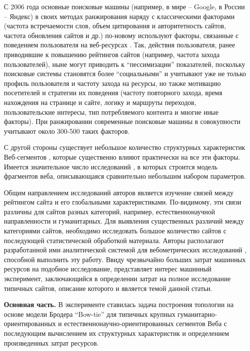С 2006 года основные поисковые машины (например, в мире -- Google, в России -- Яндекс) в своих методах ранжирования наряду с классическими факторами \cite{Kleinberg, BrinPage, Chakrabarti} (частота встречаемости слов, объем цитирования и авторитетность сайтов, частота обновления сайтов и др.) по-новому используют факторы, связанные с поведением пользователя на веб-ресурсах \cite{GuhaKunduBhadra,AntoniouPlegasTsakalidis,FeuerSavevAslam}. Так, действия пользователя, ранее приводившие к повышению рейтингов сайтов (например, частота захода пользователей), ныне могут приводить к “пессимизации” показателей, поскольку поисковые системы становятся более “социальными” и учитывают уже не только профиль пользователя и частоту захода на ресурсы, но также мотивацию посетителей и стратегии их поведения (частоту повторного захода, время нахождения на странице и сайте, логику и маршруты переходов, пользовательские интересы, тип потребляемого контента и многие иные факторы). При ранжировании современные поисковые машины в совокупности учитывают около 300-500 таких факторов.

С другой стороны существует небольшое количество структурных характеристик Веб-сегментов \cite{ChoRoy}, которые существенно влияют практически на все эти факторы. Имеется значительное число исследований \cite{Kleinberg,ChoRoy,BroderKumarMaghoul,AguilloGranadinoOrtega,StuartThelwallHarries,Chakrabarti,Thelwall,Pechnikov,PechnikovNwohiri}, в которых строится модель фрагментов веба, описывающаяся сравнительно небольшим набором параметров.

Общим направлением исследований авторов является изучение связей между рейтингом сайта и его глобальными характеристиками. По-видимому, эти связи различны для сайтов разных категорий, например, естественнонаучной направленности и гуманитарных. Для выявления существенных различий между категориями сайтов, необходимо исследовать большое количество сайтов с последующей статистической обработкой материала. Авторы располагают разработанной ими аналитической системой для вебометрических исследований \cite{BlekanovSergeevMaksimov,BlekanovSergeevMartynenko}, способной выполнить эту работу. Ввиду чрезвычайно больших затрат машинных ресурсов на подобное исследование, представляет интерес машинный эксперимент, заключающийся в определении затрат на полное исследование типичных сайтов, описание которого и является темой данной статьи.

\textbf{Основная часть.} В эксперименте ставилась задача построения топологии на основе модели Бродера “Bow-tie” \cite{BroderKumarMaghoul,Thelwall} для типичных крупных гуманитарно-ориентированных и естественнонаучно-ориентированных сегментов Веба с последующим вычислением их структурных характеристик и определением произведенных затрат ресурсов.


